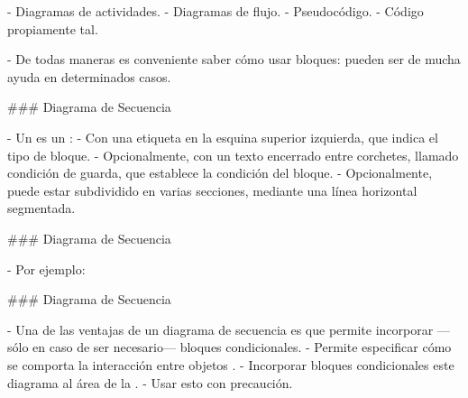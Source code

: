 \buildrboxx{}

- Diagramas de actividades.
- Diagramas de flujo.
- Pseudocódigo.
- Código propiamente tal.

\finishrboxx

- De todas maneras es conveniente saber cómo usar bloques: pueden ser de mucha ayuda en determinados casos.

### Diagrama de Secuencia


- Un  es un :
    - Con una etiqueta en la esquina superior izquierda, que indica el tipo de bloque.
    - Opcionalmente, con un texto encerrado entre corchetes, llamado condición de guarda, que establece la condición del bloque.
    - Opcionalmente, puede estar subdividido en varias secciones, mediante una línea horizontal segmentada.

### Diagrama de Secuencia


- Por ejemplo:


### Diagrama de Secuencia


- Una de las ventajas de un diagrama de secuencia es que permite incorporar ---sólo en caso
de ser necesario--- bloques condicionales.
    - Permite especificar cómo se comporta la interacción entre objetos .
    - Incorporar bloques condicionales  este diagrama al área de la .
        - Usar esto con precaución.

